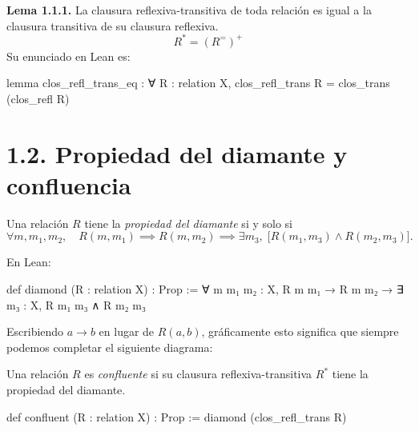 \documentclass[
  spanish,
  letterpaper,
  DIV=11,
  numbers=noendperiod]{scrreprt}
\newenvironment{Shaded}{\begin{snugshade}}{\end{snugshade}}
\newcommand{\KeywordTok}[1]{\textcolor[rgb]{0.00,0.23,0.31}{\textbf{#1}}}
\newcommand{\NormalTok}[1]{\textcolor[rgb]{0.00,0.23,0.31}{#1}}
\renewcommand{\NormalTok}[1]{\textcolor[HTML]{000000}{#1}}
\renewcommand{\KeywordTok}[1]{\textcolor[HTML]{0000FF}{#1}}
\theoremstyle{remark}
\begin{document}
\textbf{Lema 1.1.1.} La clausura reflexiva-transitiva de toda relación
es igual a la clausura transitiva de su clausura reflexiva.
\[ R^* = (R^{=})^+ \] Su enunciado en Lean es:

\begin{Shaded}
\begin{Highlighting}[]
\KeywordTok{lemma}\NormalTok{ clos\_refl\_trans\_eq : ∀ R : relation X, }
\NormalTok{    clos\_refl\_trans R = clos\_trans (clos\_refl R)}
\end{Highlighting}
\end{Shaded}

\section{1.2. Propiedad del diamante y
confluencia}\label{propiedad-del-diamante-y-confluencia}

Una relación \(R\) tiene la \emph{propiedad del diamante} si y solo si
\[
\forall m,m_1,m_2,\quad
R(m,m_1)\implies R(m,m_2)\implies
\exists m_3,\;
\bigl[R(m_1,m_3)\land R(m_2,m_3)\bigr].
\]

En Lean:

\begin{Shaded}
\begin{Highlighting}[]
\KeywordTok{def}\NormalTok{ diamond (R : relation X) : }\KeywordTok{Prop}\NormalTok{ :=}
\NormalTok{  ∀ m m₁ m₂ : X, R m m₁ → R m m₂ → ∃ m₃ : X, R m₁ m₃ ∧ R m₂ m₃}
\end{Highlighting}
\end{Shaded}

Escribiendo \(a \longrightarrow b\) en lugar de \(R(a,b)\), gráficamente
esto significa que siempre podemos completar el siguiente diagrama:

\begin{center}
\end{center}

Una relación \(R\) es \emph{confluente} si su clausura
reflexiva-transitiva \(R^*\) tiene la propiedad del diamante.

\begin{Shaded}
\begin{Highlighting}[]
\KeywordTok{def}\NormalTok{ confluent (R : relation X) : }\KeywordTok{Prop}\NormalTok{ :=}
\NormalTok{  diamond (clos\_refl\_trans R)}
\end{Highlighting}
\end{Shaded}
\end{document}

